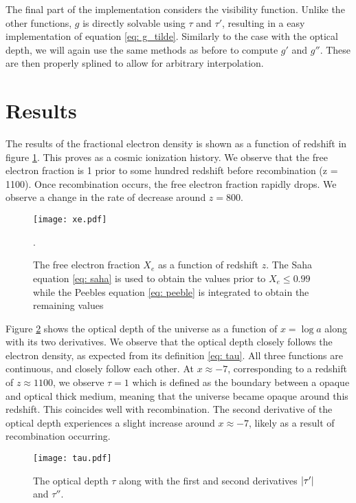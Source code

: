 \documentclass[a4paper, 10pt, reqno]{amsart}
\begin{document}
The final part of the implementation considers the visibility function. Unlike
the other functions, $g$ is directly solvable using $\tau$ and $\tau'$,
resulting in a easy implementation of equation \eqref{eq: g_tilde}. Similarly
to the case with the optical depth, we will again use the same methods as
before to compute $g'$ and $g''$. These are then properly splined to allow for
arbitrary interpolation.

\section{Results}
The results of the fractional electron density is shown as a function of
redshift in figure \ref{fig: X_e}. This proves as a cosmic ionization history.
We observe that the free electron fraction is 1 prior to some hundred redshift
before recombination (z = 1100). Once recombination occurs, the free electron
fraction rapidly drops. We observe a change in the rate of decrease around $z
= 800$.
\begin{figure}
    \centering
    \texttt{[image: xe.pdf]}
    \caption{The free electron fraction $X_e$ as a function of redshift $z$.
    The Saha equation \eqref{eq: saha} is used to obtain the values prior to
    $X_e \leq 0.99$ while the Peebles equation \eqref{eq: peeble} is
    integrated to obtain the remaining values}.
    \label{fig: X_e}
\end{figure}

Figure \ref{fig: tau} shows the optical depth of the universe as a function of
$x = \log a$ along with its two derivatives. We observe that the optical depth
closely follows the electron density, as expected from its definition
\eqref{eq: tau}. All three functions are continuous, and closely follow each
other. At $x \approx -7$, corresponding to a redshift of $z \approx 1100$, we
observe $\tau = 1$ which is defined as the boundary between a opaque and
optical thick medium, meaning that the universe became opaque around this
redshift. This coincides well with recombination. The second derivative of the
optical depth experiences a slight increase around $x \approx -7$, likely as a
result of recombination occurring.
\begin{figure}
    \centering
    \texttt{[image: tau.pdf]}
    \caption{The optical depth $\tau$ along with the first and second
    derivatives $\abs{\tau'}$ and $\tau''$.}
    \label{fig: tau}
\end{figure}
\end{document}
